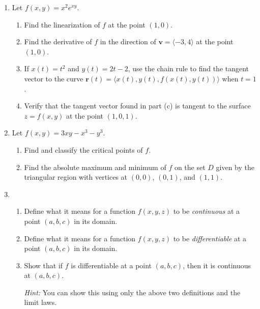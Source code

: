 \documentclass[12pt]{article}
\newcommand{\points}[1]{\marginpar{\hspace{24pt}[#1]}}
\begin{document}
\begin{enumerate}
\item Let $f(x,y) = x^2e^{xy}$.
\begin{enumerate}
\item Find the linearization of $f$ at the point $(1,0)$. \points{4}

\vspace{1.6in}


\item Find the derivative of $f$ in the direction of $\mathbf{v} = \langle -3,4\rangle$ at the point $(1,0)$. \points{3}

\vspace{1.5in}

\item If $x(t)=t^2$ and $y(t)=2t-2$, use the chain rule to find the tangent vector to the curve $\mathbf{r}(t) = \langle x(t),y(t),f(x(t),y(t))\rangle$ when $t=1$. \points{5}

\vspace{2.5in}

\item Verify that the tangent vector found in part (c) is tangent to the surface $z=f(x,y)$ at the point $(1,0,1)$.\points{3}
\end{enumerate}
\newpage

\item Let $f(x,y) = 3xy-x^3-y^3$.
\begin{enumerate}
\item Find and classify the critical points of $f$. \points{8}

\vspace{4in}

\item Find the absolute maximum and minimum of $f$ on the set $D$ given by the triangular region with vertices at $(0,0)$, $(0,1)$, and $(1,1)$. \points{7}
\end{enumerate}
\newpage

\item \begin{enumerate}
\item Define what it means for a function $f(x,y,z)$ to be {\em continuous} at a point $(a,b,c)$ in its domain. \points{2}

\vspace{1.5in}

\item Define what it means for a function $f(x,y,z)$ to be {\em differentiable} at a point $(a,b,c)$ in its domain. \points{3}

\vspace{2in}

\item Show that if $f$ is differentiable at a point $(a,b,c)$, then it is continuous at $(a,b,c)$.\points{5}

{\em Hint:} You can show this using only the above two definitions and the limit laws.
\end{enumerate}
\end{enumerate}
\newpage
\end{document}

